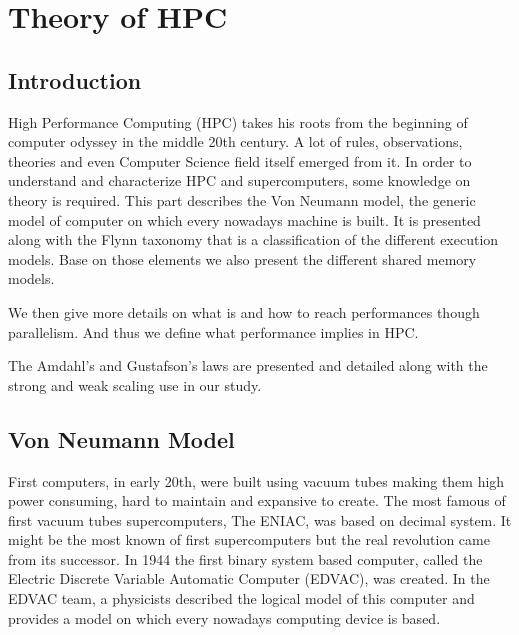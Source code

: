 
\chapter{Theory of HPC}

\section{Introduction}

High Performance Computing (HPC) takes his roots from the beginning of computer odyssey in the middle 20th century.
A lot of rules, observations, theories and even Computer Science field itself emerged from it. 
In order to understand and characterize HPC and supercomputers, some knowledge on theory is required. 
This part describes the Von Neumann model, the generic model of computer on which every nowadays machine is built.
It is presented along with the Flynn taxonomy that is a classification of the different execution models. 
Base on those elements we also present the different shared memory models. 

We then give more details on what is and how to reach performances though parallelism. 
And thus we define what performance implies in HPC. 

The Amdahl's and Gustafson's laws are presented and detailed along with the strong and weak scaling use in our study. 

\section{Von Neumann Model}
First computers, in early 20th, were built using vacuum tubes making them high power consuming, hard to maintain and expansive to create.
The most famous of first vacuum tubes supercomputers, The ENIAC, was based on decimal system.
It might be the most known of first supercomputers but the real revolution came from its successor.
In 1944 the first binary system based computer, called the Electric Discrete Variable Automatic Computer (EDVAC), was created. 
In the EDVAC team, a physicists described the logical model of this computer and provides a model on which every nowadays computing device is based. 

